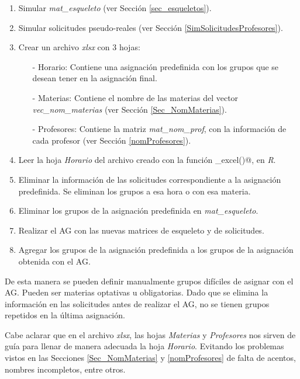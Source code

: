 \begin{enumerate}
\item Simular \textit{mat\_esqueleto} (ver Sección \ref{sec_esqueletos}).

\item Simular solicitudes pseudo-reales (ver Sección \ref{SimSolicitudesProfesores}).

\item Crear un archivo \textit{xlsx} con 3 hojas:

\begin{itemize}
\item[-] Horario: Contiene una asignación predefinida con los grupos que se desean tener en la asignación final.

\item[-] Materias: Contiene el nombre de las materias del vector \textit{vec\_nom\_materias} (ver Sección \ref{Sec_NomMaterias}).

\item[-] Profesores: Contiene la matriz \textit{mat\_nom\_prof}, con la información de cada profesor (ver Sección \ref{nomProfesores}).
\end{itemize}

\item Leer la hoja \textit{Horario} del archivo creado con la función \verb@read_excel()@, en \textit{R}.

\item Eliminar la información de las solicitudes correspondiente a la asignación predefinida. Se eliminan los grupos a esa hora o con esa materia.

\item Eliminar los grupos de la asignación predefinida en \textit{mat\_esqueleto}.

\item Realizar el AG con las nuevas matrices de esqueleto y de solicitudes.

\item Agregar los grupos de la asignación predefinida a los grupos de la asignación obtenida con el AG.
\end{enumerate}


De esta manera se pueden definir manualmente grupos difíciles de asignar con el AG. Pueden ser materias optativas u obligatorias. Dado que se elimina la información en las solicitudes antes de realizar el AG, no se tienen grupos repetidos en la última asignación.

Cabe aclarar que en el archivo \textit{xlsx}, las hojas \textit{Materias} y \textit{Profesores} nos sirven de guía para llenar de manera adecuada la hoja \textit{Horario}. Evitando los problemas vistos en las Secciones \ref{Sec_NomMaterias} y \ref{nomProfesores} de falta de acentos, nombres incompletos, entre otros.



